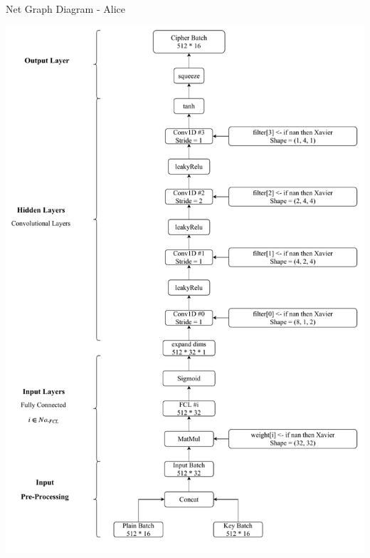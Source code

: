 \documentclass[a4paper, 12pt]{report}
\begin{document}
\newpage
\begin{blockfigure}{ Net Graph Diagram - Alice}
	\begin{center}
		\includegraphics[width = \textwidth]{Alice-Diagram}
	\end{center}
\end{blockfigure}
\newpage
\end{document}
